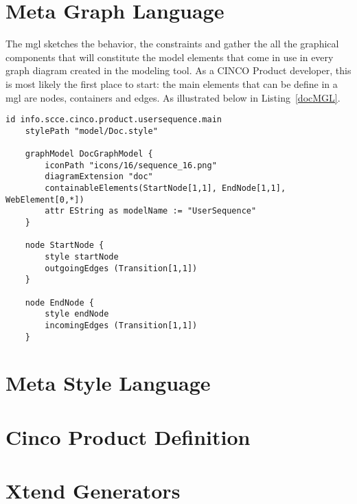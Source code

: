 \section{Meta Graph Language}\label{sec:MGL}
The \acrfull{mgl} sketches the behavior, the constraints and gather the all the graphical components that will constitute the model elements that come in use in every graph diagram created in the modeling tool. As a CINCO Product developer, this is most likely the first place to start: the main elements that can be define in a \acrshort{mgl} are nodes, containers and edges.  As illustrated below in Listing~\ref{docMGL}.

\begin{lstlisting}[language=MGL, caption={Doc.mgl for the user sequence graph model}, label=docMGL]
    id info.scce.cinco.product.usersequence.main
    stylePath "model/Doc.style"

    graphModel DocGraphModel {
        iconPath "icons/16/sequence_16.png"
        diagramExtension "doc"
        containableElements(StartNode[1,1], EndNode[1,1], WebElement[0,*])
        attr EString as modelName := "UserSequence"
    }

    node StartNode {
        style startNode
        outgoingEdges (Transition[1,1])
    }

    node EndNode {
        style endNode
        incomingEdges (Transition[1,1])
    }
\end{lstlisting}

\section{Meta Style Language}\label{sec:MSL}

\section{Cinco Product Definition}\label{sec:CPD}

\section{Xtend Generators}\label{sec:GEN}
